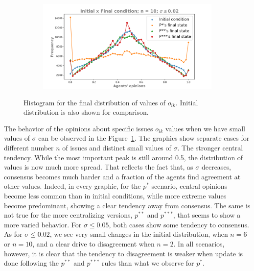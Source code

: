 \documentclass{article}
\begin{document}
\begin{figure}[H]
\begin{subfigure}[b]{0.49\textwidth}
     \end{subfigure}
     \begin{subfigure}[b]{0.49\textwidth}
       \includegraphics[width=\textwidth]{img/oiks/oiks_smallsigma002_n10.png}
     \end{subfigure}
	\caption{Histogram for the final distribution of values of $o_{ik}$. Initial distribution is also shown for comparison.}
	\label{fig:oik}
\end{figure}

The behavior of the opinions about specific issues $o_{ik}$ values when we have
small values of $\sigma$ can be observed in the Figure~\ref{fig:oik}. The
graphics show separate cases for different number $n$ of issues and distinct
small values of $\sigma$. The stronger central tendency. While the most
important peak is still around 0.5, the distribution of values is now much more
spread. That reflects the fact that, as $\sigma$ decreases, consensus becomes
much harder and a fraction of the agents find agreement at other values. Indeed,
in every graphic, for the $p^*$ scenario, central opinions become less common
than in initial conditions, while more extreme values become predominant,
showing a clear tendency away from consensus. The same is not true for the more
centralizing versions, $p^{**}$ and $p^{***}$, that seems to show a more varied
behavior. For $\sigma \leq 0.05$, both cases show some tendency to consensus. As
for $\sigma \leq 0.02$, we see very small changes in the initial distribution,
when $n=6$ or $n=10$, and a clear drive to disagreement when $n=2$. In all
scenarios, however, it is clear that the tendency to disagreement is weaker when
update is done following the $p^{**}$ and $p^{***}$ rules than what we observe
for $p^*$.
\end{document}

